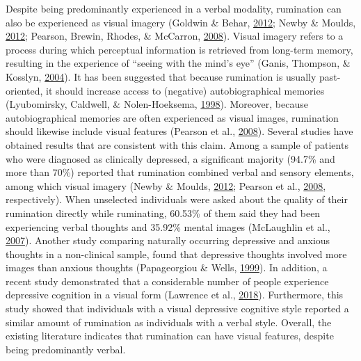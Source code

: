 \documentclass[a4paper,12pt,twoside,openright,oldfontcommands]{memoir}
\begin{document}
Despite being predominantly experienced in a verbal modality, rumination can also be experienced as visual imagery (Goldwin \& Behar, \protect\hyperlink{ref-goldwin_concreteness_2012}{2012}; Newby \& Moulds, \protect\hyperlink{ref-newby_comparison_2012}{2012}; Pearson, Brewin, Rhodes, \& McCarron, \protect\hyperlink{ref-pearson_frequency_2008}{2008}). Visual imagery refers to a process during which perceptual information is retrieved from long-term memory, resulting in the experience of \enquote{seeing with the mind's eye} (Ganis, Thompson, \& Kosslyn, \protect\hyperlink{ref-ganis_brain_2004}{2004}). It has been suggested that because rumination is usually past-oriented, it should increase access to (negative) autobiographical memories (Lyubomirsky, Caldwell, \& Nolen-Hoeksema, \protect\hyperlink{ref-Lyubomirsky1998}{1998}). Moreover, because autobiographical memories are often experienced as visual images, rumination should likewise include visual features (Pearson et al., \protect\hyperlink{ref-pearson_frequency_2008}{2008}). Several studies have obtained results that are consistent with this claim. Among a sample of patients who were diagnosed as clinically depressed, a significant majority (94.7\% and more than 70\%) reported that rumination combined verbal and sensory elements, among which visual imagery (Newby \& Moulds, \protect\hyperlink{ref-newby_comparison_2012}{2012}; Pearson et al., \protect\hyperlink{ref-pearson_frequency_2008}{2008}, respectively). When unselected individuals were asked about the quality of their rumination directly while ruminating, 60.53\% of them said they had been experiencing verbal thoughts and 35.92\% mental images (McLaughlin et al., \protect\hyperlink{ref-mclaughlin_effects_2007}{2007}). Another study comparing naturally occurring depressive and anxious thoughts in a non-clinical sample, found that depressive thoughts involved more images than anxious thoughts (Papageorgiou \& Wells, \protect\hyperlink{ref-papageorgiou_process_1999}{1999}). In addition, a recent study demonstrated that a considerable number of people experience depressive cognition in a visual form (Lawrence et al., \protect\hyperlink{ref-lawrence_visual_2018}{2018}). Furthermore, this study showed that individuals with a visual depressive cognitive style reported a similar amount of rumination as individuals with a verbal style. Overall, the existing literature indicates that rumination can have visual features, despite being predominantly verbal.
\end{document}
